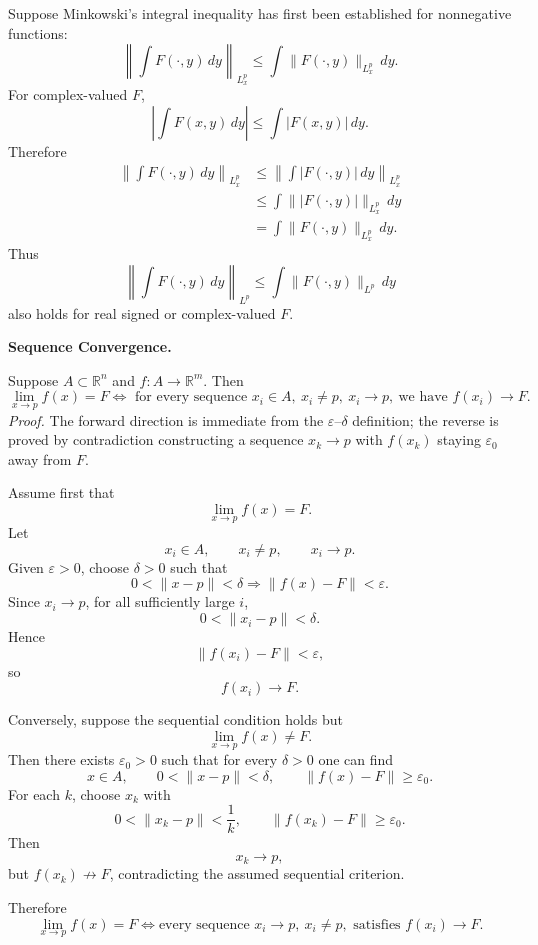 \begin{solution}
Suppose Minkowski's integral inequality has first been established for nonnegative functions:
\[
\left\|
\int F(\cdot,y)\,dy
\right\|_{L^p_x}
\le
\int
\|F(\cdot,y)\|_{L^p_x}\,dy.
\]
For complex-valued \(F\),
\[
\left|
\int F(x,y)\,dy
\right|
\le
\int|F(x,y)|\,dy.
\]
Therefore
\[
\begin{aligned}
\left\|
\int F(\cdot,y)\,dy
\right\|_{L^p_x}
&\le
\left\|
\int |F(\cdot,y)|\,dy
\right\|_{L^p_x}\\
&\le
\int
\||F(\cdot,y)|\|_{L^p_x}\,dy\\
&=
\int
\|F(\cdot,y)\|_{L^p_x}\,dy.
\end{aligned}
\]
Thus
\[
\boxed{
\left\|
\int F(\cdot,y)\,dy
\right\|_{L^p}
\le
\int
\|F(\cdot,y)\|_{L^p}\,dy
}
\]
also holds for real signed or complex-valued \(F\).
\end{solution}


\begin{problem}[CP-II-0490]
\label{prob:cp-ii-0490}
\textbf{Sequence Convergence.}

\hspace*{1.5em}Suppose $A\subset\mathbb{R}^n$ and $f:A\to\mathbb{R}^m$. Then
\[
\lim_{x\to p}f(x)=F \iff \text{ for every sequence } x_i\in A,\ x_i\neq p,\ x_i\to p,\ \text{we have } f(x_i)\to F.
\]
\textit{Proof.} The forward direction is immediate from the $\varepsilon$--$\delta$ definition; the reverse is proved by contradiction constructing a sequence $x_k\to p$ with $f(x_k)$ staying $\varepsilon_0$ away from $F$.
\end{problem}

\begin{solution}
Assume first that
\[
\lim_{x\to p}f(x)=F.
\]
Let
\[
x_i\in A,\qquad x_i\neq p,\qquad x_i\to p.
\]
Given \(\varepsilon>0\), choose \(\delta>0\) such that
\[
0<\|x-p\|<\delta
\Longrightarrow
\|f(x)-F\|<\varepsilon.
\]
Since \(x_i\to p\), for all sufficiently large \(i\),
\[
0<\|x_i-p\|<\delta.
\]
Hence
\[
\|f(x_i)-F\|<\varepsilon,
\]
so
\[
f(x_i)\to F.
\]

Conversely, suppose the sequential condition holds but
\[
\lim_{x\to p}f(x)\neq F.
\]
Then there exists \(\varepsilon_0>0\) such that for every \(\delta>0\) one can find
\[
x\in A,\qquad
0<\|x-p\|<\delta,
\qquad
\|f(x)-F\|\ge\varepsilon_0.
\]
For each \(k\), choose \(x_k\) with
\[
0<\|x_k-p\|<\frac1k,
\qquad
\|f(x_k)-F\|\ge\varepsilon_0.
\]
Then
\[
x_k\to p,
\]
but \(f(x_k)\not\to F\), contradicting the assumed sequential criterion.

Therefore
\[
\boxed{
\lim_{x\to p}f(x)=F
\iff
\text{every sequence }x_i\to p,\ x_i\neq p,\text{ satisfies }f(x_i)\to F.
}
\]
\end{solution}


